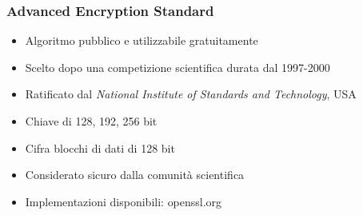 \documentclass[]{beamer}
\begin{document}
\begin{frame}
\frametitle{Advanced Encryption Standard}

\begin{itemize}
\item Algoritmo \alert{pubblico} e utilizzabile gratuitamente
\pause
\item Scelto dopo una competizione scientifica durata dal 1997-2000
\pause
\item Ratificato dal {\color{olive}\em National Institute of Standards and Technology}, USA
\pause
\item Chiave di 128, 192, 256 bit
\pause
\item Cifra blocchi di dati di 128 bit
\pause
\item Considerato sicuro dalla comunit\`a scientifica
\pause
\item Implementazioni disponibili: \alert{openssl.org}
\end{itemize}

\end{frame}
\end{document}
